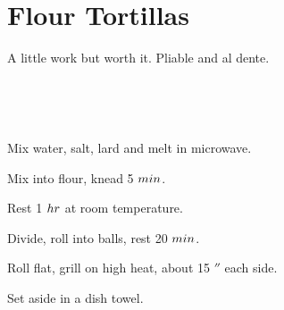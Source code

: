 \section[Tortillas]{Flour Tortillas}

\begin{recipestats}[
        servings=16,
        preptime=30~\minute,
        bakingtime=15~\minute,
        inactivetime=90~\minute,
        original=\citeauthor{essentialMexicoKennedy}~\cite{essentialMexicoKennedy},
    ]
\end{recipestats}

\begin{recipeabstract}
    A little work but worth it.
    Pliable and al dente.
\end{recipeabstract}

\begin{ingredientcolumns}
    \begin{ingredientblock}
        \\
    \end{ingredientblock}
    \begin{ingredientblock}
        \\
    \end{ingredientblock}
\end{ingredientcolumns}

\begin{preparation}
\item Mix water, salt, lard and melt in microwave.
\item Mix into flour, knead 5 $\minute$.
\item Rest 1 $\hour$ at room temperature.
\item Divide, roll into balls, rest 20 $\minute$.
\item Roll flat, grill on high heat, about 15 $\second$ each side.
\item Set aside in a dish towel.
\end{preparation}

\recipeend%
